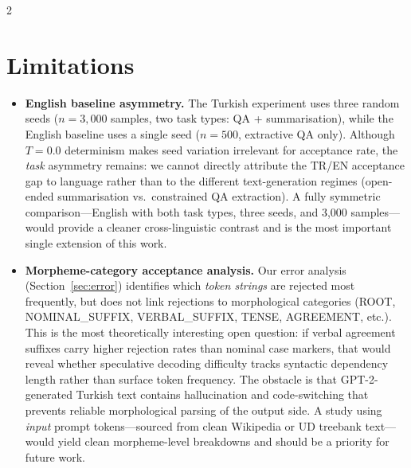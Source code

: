 \documentclass[11pt,a4paper]{article}
\begin{document}
\begin{multicols}{2}
\section{Limitations}
\label{sec:limitations}

\begin{itemize}[leftmargin=*]

  \item \textbf{English baseline asymmetry.}
        The Turkish experiment uses three random seeds ($n=3{,}000$
        samples, two task types: QA + summarisation), while the English
        baseline uses a single seed ($n=500$, extractive QA only).
        Although $T=0.0$ determinism makes seed variation irrelevant for
        acceptance rate, the \emph{task} asymmetry remains: we cannot
        directly attribute the TR/EN acceptance gap to language rather
        than to the different text-generation regimes (open-ended
        summarisation vs.\ constrained QA extraction).
        A fully symmetric comparison—English with both task types,
        three seeds, and 3,000 samples—would provide a cleaner
        cross-linguistic contrast and is the most important single
        extension of this work.

  \item \textbf{Morpheme-category acceptance analysis.}
        Our error analysis (Section~\ref{sec:error}) identifies which
        \emph{token strings} are rejected most frequently, but does not
        link rejections to morphological categories
        (ROOT, NOMINAL\_SUFFIX, VERBAL\_SUFFIX, TENSE, AGREEMENT, etc.).
        This is the most theoretically interesting open question: if
        verbal agreement suffixes carry higher rejection rates than
        nominal case markers, that would reveal whether speculative
        decoding difficulty tracks syntactic dependency length rather
        than surface token frequency.
        The obstacle is that GPT-2-generated Turkish text contains
        hallucination and code-switching that prevents reliable
        morphological parsing of the output side.
        A study using \emph{input} prompt tokens—sourced from clean
        Wikipedia or UD treebank text—would yield clean morpheme-level
        breakdowns and should be a priority for future work.


\end{itemize}
\end{multicols}
\end{document}
